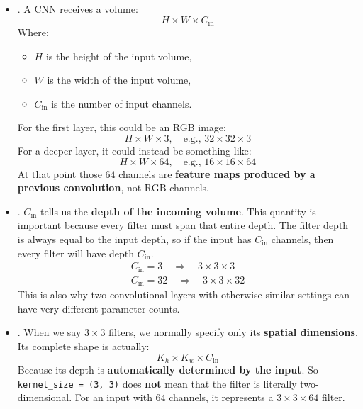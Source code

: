 \begin{itemize}
    \item {}. A CNN receives a volume:
    \begin{equation*}
        H \times W \times C_{\text{in}}
    \end{equation*}
    Where:
    \begin{itemize}
        \item $H$ is the height of the input volume,
        \item $W$ is the width of the input volume,
        \item $C_{\text{in}}$ is the number of input channels.
    \end{itemize}
    For the first layer, this could be an RGB image:
    \begin{equation*}
        H \times W \times 3, \quad \text{e.g., } 32 \times 32 \times 3
    \end{equation*}
    For a deeper layer, it could instead be something like:
    \begin{equation*}
        H \times W \times 64, \quad \text{e.g., } 16 \times 16 \times 64
    \end{equation*}
    At that point those $64$ channels are \textbf{feature maps produced by a previous convolution}, not RGB channels.


    \item {}. $C_{\text{in}}$ tells us the \textbf{depth of the incoming volume}. This quantity is important because every filter must span that entire depth. The filter depth is always equal to the input depth, so if the input has $C_{\text{in}}$ channels, then every filter will have depth $C_{\text{in}}$.
    \begin{gather*}
        C_{\text{in}} = 3 \quad \Rightarrow \quad 3 \times 3 \times \boxed{3} \\
        C_{\text{in}} = 32 \quad \Rightarrow \quad 3 \times 3 \times \boxed{32}
    \end{gather*}
    This is also why two convolutional layers with otherwise similar settings can have very different parameter counts.
    

    \item {}. When we say $3 \times 3$ filters, we normally specify only its \textbf{spatial dimensions}. Its complete shape is actually:
    \begin{equation*}
        K_h \times K_w \times C_{\text{in}}
    \end{equation*}
    Because its depth is \textbf{automatically determined by the input}. So \texttt{kernel\_size = (3, 3)} does \textbf{not} mean that the filter is literally two-dimensional. For an input with $64$ channels, it represents a $3 \times 3 \times 64$ filter.
    

\end{itemize}
